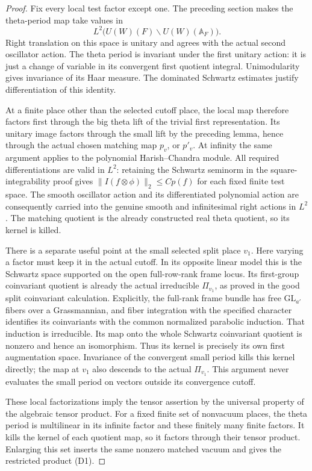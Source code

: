 \begin{proof}
Fix every local test factor except one.
The preceding section makes the theta-period map take values in
\[
 L^2\bigl(U(W)(F)\backslash U(W)(\mathbb A_F)\bigr).
\]
Right translation on this space is unitary and agrees with the
actual second oscillator action. The theta period is invariant
under the first unitary action: it is just a change of variable
in its convergent first quotient integral. Unimodularity gives
invariance of its Haar measure. The dominated Schwartz estimates
justify differentiation of this identity.

At a finite place other than the selected cutoff place, the local
map therefore factors first through the big theta lift of the
trivial first representation. Its unitary image factors through
the small lift by the preceding lemma, hence through the actual
chosen matching map \(p_v\), or \(p'_v\).
At infinity the same argument applies to the polynomial
Harish--Chandra module. All required differentiations are valid in
\(L^2\): retaining the Schwartz seminorm in the square-integrability
proof gives
\(\|I(f\otimes\phi)\|_2\le C p(f)\) for each fixed finite test space.
The smooth oscillator action and its differentiated polynomial
action are consequently carried into the genuine smooth and
infinitesimal right actions in \(L^2\). The matching quotient is the
already constructed real theta quotient, so its kernel is killed.

There is a separate useful point at the small selected split place
\(v_1\). Here varying a factor must keep it in the actual cutoff.
In its opposite linear model this is the Schwartz space supported
on the open full-row-rank frame locus.
Its first-group coinvariant quotient is already the actual
irreducible \(\Pi_{v_1}\), as proved in the good split coinvariant
calculation. Explicitly, the full-rank frame bundle has free
\(\mathrm{GL}_{a'}\) fibers over a Grassmannian, and fiber integration
with the specified character identifies its coinvariants with the
common normalized parabolic induction. That induction is irreducible.
Its map onto the whole Schwartz coinvariant quotient is nonzero
and hence an isomorphism. Thus its kernel is precisely its own
first augmentation space. Invariance of the convergent small period
kills this kernel directly; the map at \(v_1\) also descends to the
actual \(\Pi_{v_1}\). This argument never evaluates the small
period on vectors outside its convergence cutoff.

These local factorizations imply the tensor assertion by the
universal property of the algebraic tensor product. For a fixed
finite set of nonvacuum places, the theta period is multilinear
in its infinite factor and these finitely many finite factors.
It kills the kernel of each quotient map, so it factors through
their tensor product. Enlarging this set inserts the same nonzero
matched vacuum and gives the restricted product (D1).


\end{proof}
